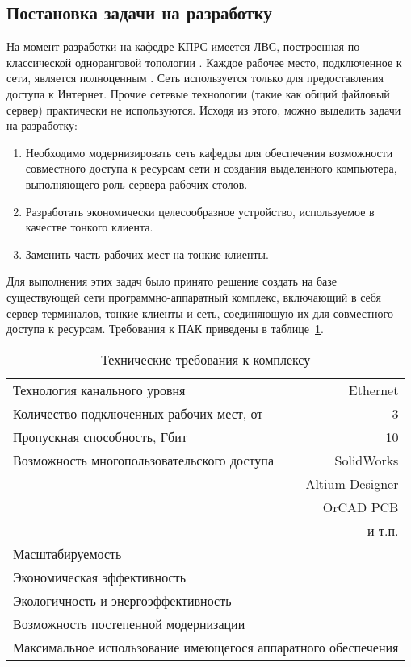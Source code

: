 \subsection{Постановка задачи на разработку}

На момент разработки на кафедре КПРС имеется ЛВС, построенная по классической
одноранговой топологии . Каждое рабочее место, подключенное к сети, является
полноценным . Сеть используется только для предоставления доступа
к Интернет. Прочие сетевые технологии (такие как общий файловый сервер) практически не
используются. Исходя из этого, можно выделить задачи на разработку:

\begin{enumerate}
    \item Необходимо модернизировать сеть кафедры для обеспечения возможности
        совместного доступа к ресурсам сети и создания выделенного компьютера,
        выполняющего роль сервера рабочих столов.
    \item Разработать экономически целесообразное устройство, используемое в качестве
        тонкого клиента.
    \item Заменить часть рабочих мест на тонкие клиенты.
\end{enumerate}

Для выполнения этих задач было принято решение создать на базе существующей сети
программно-аппаратный комплекс, включающий в себя сервер терминалов, тонкие клиенты и
сеть, соединяющую их для совместного доступа к ресурсам. Требования к ПАК приведены в
таблице~\ref{tab:reqs}.

\begin{table}[h]
    \centering
    \caption{Технические требования к комплексу}
    \label{tab:reqs}
    \begin{tabularx}{\linewidth}{Xr}
        \toprule
        Технология канального уровня & Ethernet \\
        Количество подключенных рабочих мест, от & 3 \\
        Пропускная способность, Гбит & 10 \\
        \midrule
        Возможность многопользовательского доступа & SolidWorks \\
                                                   & Altium Designer \\
                                                   & OrCAD PCB \\
                                                   & и т.п. \\
        \midrule
        Масштабируемость & \\
        Экономическая эффективность & \\
        Экологичность и энергоэффективность & \\
        Возможность постепенной модернизации & \\
        \multicolumn{2}{l}{Максимальное использование имеющегося аппаратного
        обеспечения} \\
        \bottomrule
    \end{tabularx}
\end{table}
